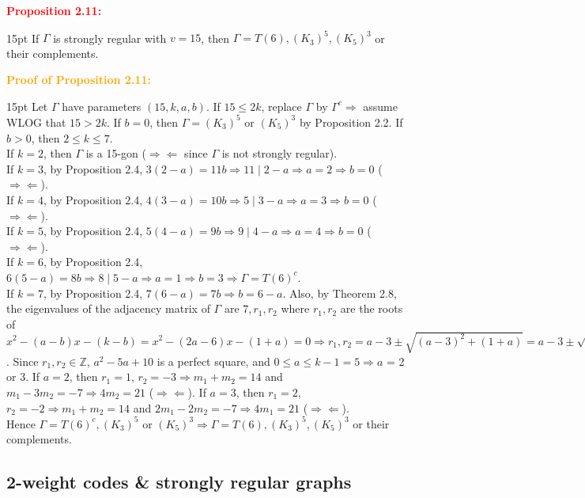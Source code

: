 \documentclass[12pt]{article}
\newcommand{\noparskip}{\vspace{-\parskip}}
\newenvironment{dent}
	{\begin{adjustwidth}{15pt}{}\noparskip}
	{\end{adjustwidth}}
\newenvironment{result}[1]
	{\textcolor{Red}{\textbf{#1:}}\begin{dent}}
	{\end{dent}}
\newenvironment{proof}[1]
	{\textcolor{Orange}{\textbf{Proof of #1:}}\begin{dent}}
	{\end{dent}}
\renewcommand{\implies}{\Rightarrow}
\newcommand{\contradiction}{\Rightarrow \Leftarrow}
\newcommand{\Z}{\mathbb{Z}}
\begin{document}
\begin{result}{Proposition 2.11}
If $\Gamma$ is strongly regular with $v = 15$, then $\Gamma = T(6), (K_3)^5, (K_5)^3$ or their complements.
\end{result}

\begin{proof}{Proposition 2.11}
Let $\Gamma$ have parameters $(15, k, a, b)$. If $15 \le 2k$, replace $\Gamma$ by $\Gamma^c \implies$ assume WLOG that $15 > 2k$. If $b = 0$, then $\Gamma = (K_3)^5$ or $(K_5)^3$ by Proposition 2.2. If $b > 0$, then $2 \le k \le 7$. \\
If $k = 2$, then $\Gamma$ is a 15-gon ($\contradiction$ since $\Gamma$ is not strongly regular). \\
If $k = 3$, by Proposition 2.4, $3(2 - a) = 11b \implies 11 \mid 2 - a \implies a = 2 \implies b = 0$ ($\contradiction$). \\
If $k = 4$, by Proposition 2.4, $4(3 - a) = 10b \implies 5 \mid 3 - a \implies a = 3 \implies b = 0$ ($\contradiction$). \\
If $k = 5$, by Proposition 2.4, $5(4 - a) = 9b \implies 9 \mid 4 - a \implies a = 4 \implies b = 0$ ($\contradiction$). \\
If $k = 6$, by Proposition 2.4, $6(5 - a) = 8b \implies 8 \mid 5 - a \implies a = 1 \implies b = 3 \implies \Gamma = T(6)^c$. \\
If $k = 7$, by Proposition 2.4, $7(6 - a) = 7b \implies b = 6 - a$. Also, by Theorem 2.8, the eigenvalues of the adjacency matrix of $\Gamma$ are $7, r_1, r_2$ where $r_1, r_2$ are the roots of $x^2 - (a - b)x - (k - b) = x^2 - (2a - 6)x - (1 + a) = 0 \implies r_1, r_2 = a - 3 \pm \sqrt{(a - 3)^2 + (1 + a)} = a - 3 \pm \sqrt{a^2 - 5a + 10}$. Since $r_1, r_2 \in \Z$, $a^2 - 5a + 10$ is a perfect square, and $0 \le a \le k - 1 = 5 \implies a$ = 2 or 3. If $a = 2$, then $r_1 = 1$, $r_2 = -3 \implies m_1 + m_2 = 14$ and $m_1 - 3m_2 = -7 \implies 4m_2 = 21$ ($\contradiction$). If $a = 3$, then $r_1 = 2$, $r_2 = -2 \implies m_1 + m_2 = 14$ and $2m_1 - 2m_2 = -7 \implies 4m_1 = 21$ ($\contradiction$). \\
Hence $\Gamma = T(6)^c, (K_3)^5$ or $(K_5)^3 \implies \Gamma = T(6), (K_3)^5, (K_5)^3$ or their complements.
\end{proof}

\subsection{2-weight codes \& strongly regular graphs}
\end{document}
